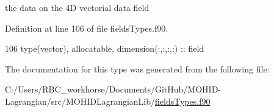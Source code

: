 the data on the 4D vectorial data field 



Definition at line 106 of file fields\+Types.\+f90.


\begin{DoxyCode}
106         \textcolor{keywordtype}{type}(vector), \textcolor{keywordtype}{allocatable}, \textcolor{keywordtype}{dimension(:,:,:,:)} :: field
\end{DoxyCode}


The documentation for this type was generated from the following file\+:\begin{DoxyCompactItemize}
\item 
C\+:/\+Users/\+R\+B\+C\+\_\+workhorse/\+Documents/\+Git\+Hub/\+M\+O\+H\+I\+D-\/\+Lagrangian/src/\+M\+O\+H\+I\+D\+Lagrangian\+Lib/\mbox{\hyperlink{fields_types_8f90}{fields\+Types.\+f90}}\end{DoxyCompactItemize}

